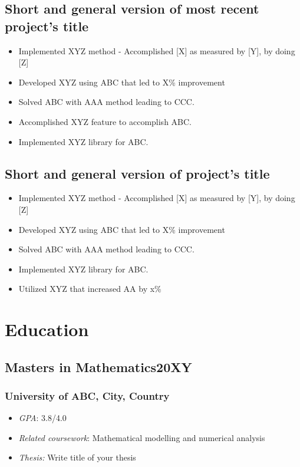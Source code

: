 \documentclass[11pt]{article}
\begin{document}
    \subsection{Short and general version of most recent project's title} %
    \begin{itemize}
        \item[\checkmark] Implemented XYZ method - Accomplished [X] as measured by [Y], by doing [Z] 
        \item[\checkmark] Developed XYZ using ABC that led to X\% improvement 
        \item[\checkmark] Solved ABC with AAA method leading to CCC.
        \item[\checkmark] Accomplished XYZ feature to accomplish ABC.
        \item[\checkmark] Implemented XYZ library for ABC.
    \end{itemize}

    \subsection{Short and general version of project's title} %
    \begin{itemize}
        \item[\checkmark] Implemented XYZ method - Accomplished [X] as measured by [Y], by doing [Z] 
        \item[\checkmark] Developed XYZ using ABC that led to X\% improvement 
        \item[\checkmark] Solved ABC with AAA method leading to CCC.
        \item[\checkmark] Implemented XYZ library for ABC.
        \item[\checkmark] Utilized XYZ that increased AA by x\%
    \end{itemize}

    \section{Education}
    \subsection{Masters in Mathematics\hfill \normalfont 20XY}  
    
    \subsubsection{University of ABC,  City, Country}
    \begin{itemize}
        \item[\checkmark] \textit{GPA}: 3.8/4.0
        \item[\checkmark] \textit{Related coursework}: Mathematical modelling and numerical analysis
        \item[\checkmark] \textit{Thesis:} Write title of your thesis
        \end{itemize}
\end{document}
